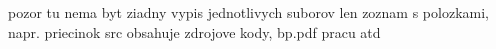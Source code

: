 pozor tu nema byt ziadny vypis jednotlivych suborov len zoznam s polozkami, napr. priecinok src obsahuje zdrojove kody, bp.pdf pracu atd